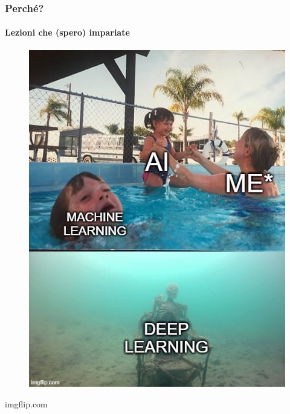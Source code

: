 \begin{frame}[t,fragile] \frametitle{Perché?}
\framesubtitle{Lezioni che (spero) impariate}
{\scriptsize
    \begin{minipage}[b]{\textwidth}
        \begin{minipage}[b]{0.33\textwidth}
            \centering
            \begin{figure}[ht]
                \includegraphics[width=\textwidth]{img/meme-2.jpg}
            \end{figure}
            \begin{flushright}
                \vspace*{-7pt}
                {\tiny\textcopyright imgflip.com}
            \end{flushright}
        \end{minipage}
        \begin{minipage}[b]{0.33\textwidth}
            \centering
            \begin{figure}[ht]

\end{figure}
\end{minipage}
\end{minipage}}
\end{frame}
